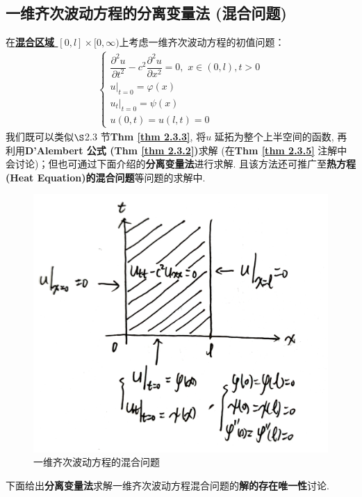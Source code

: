 \newpage

\subsection{一维齐次波动方程的分离变量法 (混合问题)}
	在\underline{\textbf{混合区域 $[0 , l] \times [0 , \infty)$}}上考虑一维齐次波动方程的初值问题：
	\begin{align}
		\begin{cases}
			\dfrac{\partial^2 u}{\partial t^2} - c^2 \dfrac{\partial^2 u}{\partial x^2} = 0 , \,\, x \in (0 , l) , t > 0 \\
			u \Big|_{t = 0} = \varphi(x) \\
			u_t \Big|_{t = 0} = \psi(x) \\
			u(0 , t) = u(l , t) = 0
		\end{cases} \label{2.17}
	\end{align}
	我们既可以类似$\S$2.3 节\textbf{Thm \ref{thm 2.3.3}}, 将$u$ 延拓为整个上半空间的函数, 再利用\textbf{D'Alembert 公式 (Thm \ref{thm 2.3.2})}求解 (在\textbf{Thm \ref{thm 2.3.5}} 注解中会讨论)；但也可通过下面介绍的\textbf{分离变量法}进行求解. 且该方法还可推广至\textbf{热方程 (Heat Equation)的混合问题}等问题的求解中. 
	
	\vspace*{1em}
	
	\begin{figure}[thbp!]
		\centering
		\includegraphics[width=0.6\linewidth]{figure/2.3-7}
		\caption{一维齐次波动方程的混合问题}
		\label{pic : 2.3-7} %
	\end{figure}
	
	\vspace*{2em}
	
	下面给出\textbf{分离变量法}求解一维齐次波动方程混合问题的\textbf{解的存在唯一性}讨论. 
	
	\newpage
	
